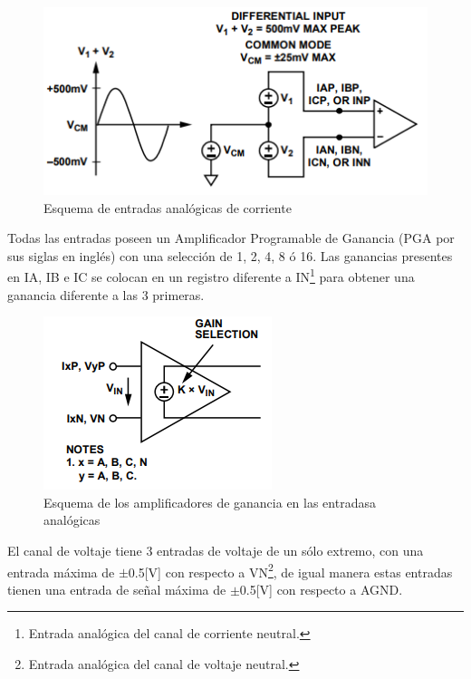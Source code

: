 \documentclass[letterpaper,12pt,oneside]{book}
\begin{document}
				\begin{figure}[!htpb]
					\centering
					\includegraphics[scale = 1.0]{Material de Consulta/EntAnCrrnt.PNG}
					\caption[Entradas analógicas de corriente]{Esquema de entradas analógicas de corriente}
					\label{EntCrnt}
				\end{figure}

				Todas las entradas poseen un Amplificador Programable de Ganancia (PGA por sus siglas en inglés) con una selección de 1, 2, 4, 8 ó 16. Las ganancias presentes en IA, IB e IC se colocan en un registro diferente a IN\footnote{Entrada analógica del canal de corriente neutral.} para obtener una ganancia diferente a las 3 primeras.

				\begin{figure}[!htpb]
					\centering
					\includegraphics[scale = 1.0]{Material de Consulta/AmpGan.PNG}
					\caption[Amplificadores de Ganancia]{Esquema de los amplificadores de ganancia en las entradasa analógicas}
					\label{AmpGan}
				\end{figure}

				El canal de voltaje tiene 3 entradas de voltaje de un sólo extremo, con una entrada máxima de  $\pm$0.5[V] con respecto a VN\footnote{Entrada analógica del canal de voltaje neutral.},
				de igual manera estas entradas tienen una entrada de señal máxima de $\pm$0.5[V] con respecto a AGND.
\end{document}
